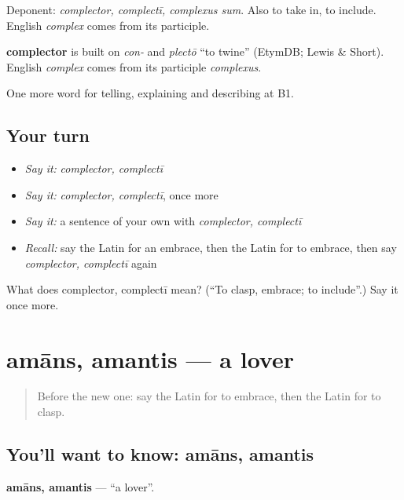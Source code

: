 Deponent: \emph{complector, complectī, complexus sum}. Also to take in, to include. English \emph{complex} comes from its participle.

\begin{cousinweb}
\textbf{complector} is built on \emph{con-} and \emph{plectō} \textquotedblleft{}to twine\textquotedblright{} (EtymDB; Lewis \& Short). English \emph{complex} comes from its participle \emph{complexus}.
\end{cousinweb}

\begin{grammarlens}[title={What you've built}]
One more word for telling, explaining and describing at B1.
\end{grammarlens}

\subsection*{Your turn}
\begin{itemize}
\raggedright
  \item \emph{Say it:} \emph{complector, complectī}
  \item \emph{Say it:} \emph{complector, complectī}, once more
  \item \emph{Say it:} a sentence of your own with \emph{complector, complectī}
  \item \emph{Recall:} say the Latin for an embrace, then the Latin for to embrace, then say \emph{complector, complectī} again
\end{itemize}

\begin{tcolorbox}[breakable,colback=teal!4,colframe=teal!35!black,title={Before you move on}]
What does complector, complectī mean? (\textquotedblleft{}To clasp, embrace; to include\textquotedblright{}.) Say it once more.
\end{tcolorbox}
\section[amāns, amantis]{amāns, amantis — a lover}

\label{lesson:LA-C535-amans}



\begin{quote}
Before the new one: say the Latin for to embrace, then the Latin for to clasp.
\end{quote}

\subsection*{You'll want to know: amāns, amantis}
\textbf{amāns, amantis} — \textquotedblleft{}a lover\textquotedblright{}.

